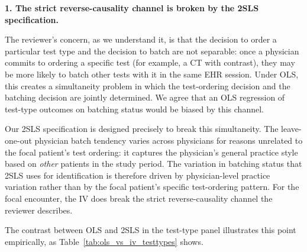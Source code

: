 \documentclass[11pt]{article}
\newcommand{\1}{\hbox{\rm 1\kern-.35em 1}}
\begin{document}
\textbf{1. The strict reverse-causality channel is broken by the 2SLS specification.}

The reviewer's concern, as we understand it, is that the decision to order a particular test type and the decision to batch are not separable: once a physician commits to ordering a specific test (for example, a CT with contrast), they may be more likely to batch other tests with it in the same EHR session. Under OLS, this creates a simultaneity problem in which the test-ordering decision and the batching decision are jointly determined. We agree that an OLS regression of test-type outcomes on batching status would be biased by this channel.

Our 2SLS specification is designed precisely to break this simultaneity. The leave-one-out physician batch tendency varies across physicians for reasons unrelated to the focal patient's test ordering: it captures the physician's general practice style based on \textit{other} patients in the study period. The variation in batching status that 2SLS uses for identification is therefore driven by physician-level practice variation rather than by the focal patient's specific test-ordering pattern. For the focal encounter, the IV does break the strict reverse-causality channel the reviewer describes.

The contrast between OLS and 2SLS in the test-type panel illustrates this point empirically, as Table~\ref{tab:ols_vs_iv_testtypes} shows.
\end{document}
